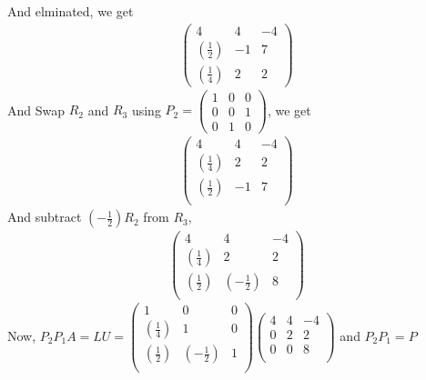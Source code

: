 \documentclass[11pt,oneside]{book}
\theoremstyle{break}
\theoremstyle{break}
\begin{document}
And elminated, we get \begin{align*}
\begin{pmatrix}
4&4&-4\\
(\frac{1}{2})&-1&7\\
(\frac{1}{4})&2&2
\end{pmatrix}
\end{align*}
And Swap $R_2$ and $R_3$ using $P_2=\begin{pmatrix}
1&0&0\\
0&0&1\\
0&1&0
\end{pmatrix}$, we get \begin{align*}
\begin{pmatrix}
4&4&-4\\
(\frac{1}{4})&2&2\\
(\frac{1}{2})&-1&7\\
\end{pmatrix}
\end{align*}
And subtract $(-\frac{1}{2})R_2$ from $R_3,$ \begin{align*}
\begin{pmatrix}
4&4&-4\\
(\frac{1}{4})&2&2\\
(\frac{1}{2})&(-\frac{1}{2})&8\\
\end{pmatrix}
\end{align*}
Now, $P_2P_1A=LU=\begin{pmatrix}
1&0&0\\
(\frac{1}{4})&1&0\\
(\frac{1}{2})&(-\frac{1}{2})&1\\
\end{pmatrix}\begin{pmatrix}
4&4&-4\\
0&2&2\\
0&0&8\\
\end{pmatrix}$
and $P_2P_1=P$\\
\end{document}
